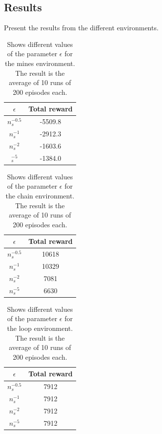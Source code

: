 \documentclass[11pt]{article}
\numberwithin{equation}{section}
\begin{document}
\begin{flushleft}
\section{Results}

Present the results from the different environments.

\begin{table}[H]
\caption{Shows different values of the parameter $\epsilon$ for the mines environment. The result is the average of 10 runs of 200 episodes each.}
\begin{center}
\begin{tabular}{|c|c|}
\hline
$\epsilon$ & Total reward \\ \hline
$n_s^{-0.5}$ & -5509.8 \\ \hline
$n_s^{-1}$ & -2912.3 \\ \hline
$n_s^{-2}$ & -1603.6 \\ \hline
$_s^{-5}$ & -1384.0 \\
\hline
\end{tabular}
\label{tab:minesMean}
\end{center}
\end{table}

\begin{table}[H]
\caption{Shows different values of the parameter $\epsilon$ for the chain environment. The result is the average of 10 runs of 200 episodes each.}
\begin{center}
\begin{tabular}{|c|c|}
\hline
$\epsilon$ & Total reward \\ \hline
$n_s^{-0.5}$ & 10618 \\ \hline
$n_s^{-1}$ & 10329 \\ \hline
$n_s^{-2}$ & 7081 \\ \hline
$n_s^{-5}$ & 6630 \\
\hline
\end{tabular}
\label{tab:chainMean}
\end{center}
\end{table}

\begin{table}[H]
\caption{Shows different values of the parameter $\epsilon$ for the loop environment. The result is the average of 10 runs of 200 episodes each.}
\begin{center}
\begin{tabular}{|c|c|}
\hline
$\epsilon$ & Total reward \\ \hline
$n_s^{-0.5}$ & 7912 \\ \hline
$n_s^{-1}$ & 7912 \\ \hline
$n_s^{-2}$ & 7912 \\ \hline
$n_s^{-5}$ & 7912 \\
\hline
\end{tabular}
\label{tab:loopMean}
\end{center}
\end{table}


\end{flushleft}
\end{document}
